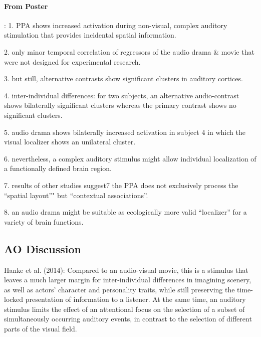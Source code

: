 \documentclass[english]{article}
\begin{document}

\paragraph{From Poster}: 1. PPA shows increased activation during non-visual,
complex auditory stimulation that provides incidental spatial information.

2. only minor temporal correlation of regressors of the audio drama \& movie that were not designed for experimental research.

3. but still, alternative contrasts show significant clusters in auditory
cortices.

4. inter-individual differences: for two subjects, an alternative audio-contrast
shows bilaterally significant clusters whereas the primary contrast shows no
significant clusters.

5. audio drama shows bilaterally increased activation in subject 4 in which the
visual localizer shows an unilateral cluster.

6. nevertheless, a  complex auditory stimulus might allow individual
localization of a functionally defined brain region.

7. results of other studies suggest7 the PPA does not exclusively process the
``spatial layout''" but ``contextual associations''.

8. an audio drama might be suitable as ecologically more valid ``localizer'' for
a variety of brain functions.


\subsection{AO Discussion}

Hanke et al. (2014): Compared to an audio-visual movie, this is a stimulus that
leaves a much larger margin for inter-individual differences in imagining
scenery, as well as actors' character and personality traits, while still
preserving the time-locked presentation of information to a listener. At the
same time, an auditory stimulus limits the effect of an attentional focus on the
selection of a subset of simultaneously occurring auditory events, in contrast
to the selection of different parts of the visual field.
\end{document}
